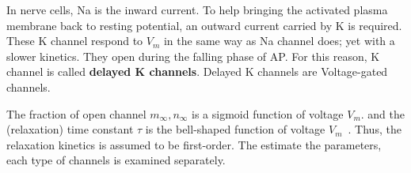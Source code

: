\begin{mdframed}
  In nerve cells, Na is the inward current. To help bringing the
  activated plasma membrane back to resting potential, an outward
  current carried by K is required. These K channel respond to $V_m$
  in the same way as Na channel does; yet with a slower kinetics. They
  open during the falling phase of AP. For this reason, K channel is
  called {\bf delayed K channels}. Delayed K channels are
  Voltage-gated channels. 
\end{mdframed}
The fraction of open channel $m_\infty,n_\infty$ is a sigmoid function
of voltage $V_m. $ and the (relaxation) time constant $\tau$ is the
bell-shaped function of voltage $V_m$~\citep{lecar1975mcg}. Thus, the
relaxation kinetics is assumed to be first-order. The estimate the
parameters, each type of channels is examined separately.




